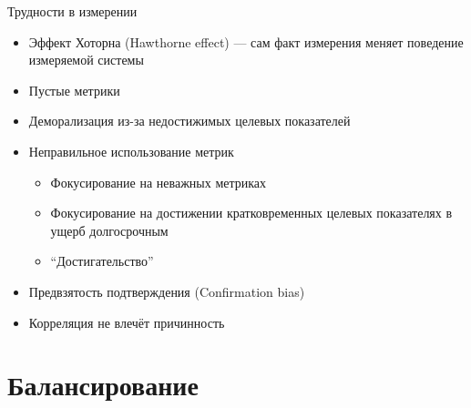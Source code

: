 \documentclass{../../slides-style}
\begin{document}
    \begin{frame}{Трудности в измерении}
        \begin{itemize}
            \item Эффект Хоторна (Hawthorne effect) --- сам факт измерения меняет поведение измеряемой системы
            \item Пустые метрики
            \item Деморализация из-за недостижимых целевых показателей
            \item Неправильное использование метрик
            \begin{itemize}
                \item Фокусирование на неважных метриках
                \item Фокусирование на достижении кратковременных целевых показателях в ущерб долгосрочным
                \item \enquote{Достигательство}
            \end{itemize}
            \item Предвзятость подтверждения (Confirmation bias)
            \item Корреляция не влечёт причинность
        \end{itemize}
    \end{frame}

    \section{Балансирование}
\end{document}

